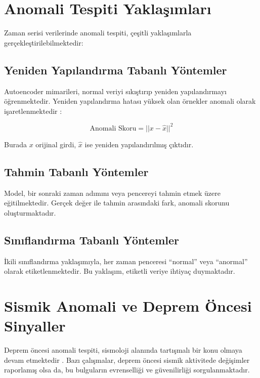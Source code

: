 \section{Anomali Tespiti Yaklaşımları}

Zaman serisi verilerinde anomali tespiti, çeşitli yaklaşımlarla gerçekleştirilebilmektedir:

\subsection{Yeniden Yapılandırma Tabanlı Yöntemler}

Autoencoder mimarileri, normal veriyi sıkıştırıp yeniden yapılandırmayı öğrenmektedir. Yeniden yapılandırma hatası yüksek olan örnekler anomali olarak işaretlenmektedir \cite{sakurada2014anomaly}:

\begin{equation}
\text{Anomali Skoru} = ||x - \hat{x}||^2
\end{equation}

Burada $x$ orijinal girdi, $\hat{x}$ ise yeniden yapılandırılmış çıktıdır.

\subsection{Tahmin Tabanlı Yöntemler}

Model, bir sonraki zaman adımını veya pencereyi tahmin etmek üzere eğitilmektedir. Gerçek değer ile tahmin arasındaki fark, anomali skorunu oluşturmaktadır.

\subsection{Sınıflandırma Tabanlı Yöntemler}

İkili sınıflandırma yaklaşımıyla, her zaman penceresi ``normal'' veya ``anormal'' olarak etiketlenmektedir. Bu yaklaşım, etiketli veriye ihtiyaç duymaktadır.

\section{Sismik Anomali ve Deprem Öncesi Sinyaller}

Deprem öncesi anomali tespiti, sismoloji alanında tartışmalı bir konu olmaya devam etmektedir \cite{geller1997earthquakes}. Bazı çalışmalar, deprem öncesi sismik aktivitede değişimler raporlamış olsa da, bu bulguların evrenselliği ve güvenilirliği sorgulanmaktadır.

